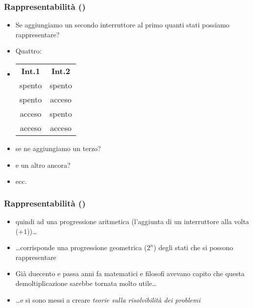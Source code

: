\begin{frame}
  \frametitle{Rappresentabilit\`a ()}

	\begin{itemize}[<+- | alert@+->]

		\item Se aggiungiamo un secondo interruttore al primo quanti stati
        possiamo rappresentare?

    \item Quattro:

     \item[~] \begin{tabular}{c | c}
             {\bfseries Int.1} & {\bfseries Int.2}\\
             spento & spento\\
             spento & acceso \\
             acceso & spento \\
             acceso & acceso \\
         \end{tabular}

    \item se ne aggiungiamo un terzo?\ 

    \item e un altro ancora?\ 

    \item{ecc.}

	\end{itemize}

\end{frame}

\begin{frame}

  \frametitle{Rappresentabilit\`a ()}

	\begin{itemize}[<+- | alert@+->]

    \item quindi ad una progressione aritmetica (l'aggiunta di un interruttore
        alla volta ($+ 1$))\dots

    \item{\dots corrisponde una progressione geometrica ($2^n$) degli stati
        che si possono rappresentare}

    \item{Gi\`a duecento e passa anni fa matematici e filosofi avevano capito che
        questa demoltiplicazione sarebbe tornata molto utile\dots}

    \item{\dots e si sono messi a creare \emph{teorie sulla risolvibilit\`a dei
        problemi}}

	\end{itemize}

\end{frame}

